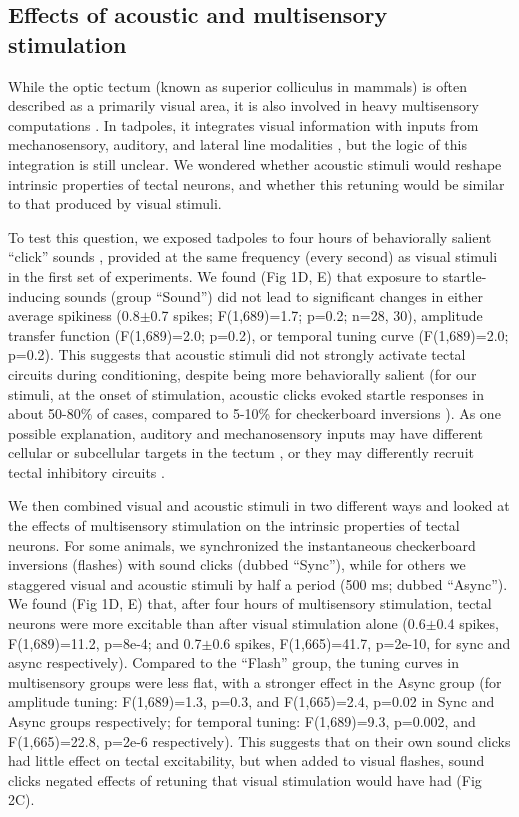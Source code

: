 \documentclass{article}
\begin{document}
\subsection*{Effects of acoustic and multisensory stimulation}

While the optic tectum (known as superior colliculus in mammals) is often described as a primarily visual area, it is also involved in heavy multisensory computations \citep{stein2014}. In tadpoles, it integrates visual information with inputs from mechanosensory, auditory, and lateral line modalities \citep{deeg2009,pratt2009,hiramoto2009,felch2016,truszkowski2017}, but the logic of this integration is still unclear. We wondered whether acoustic stimuli would reshape intrinsic properties of tectal neurons, and whether this retuning would be similar to that produced by visual stimuli. 

To test this question, we exposed tadpoles to four hours of behaviorally salient “click” sounds \citep{james2015,truszkowski2017}, provided at the same frequency (every second) as visual stimuli in the first set of experiments. We found (Fig 1D, E) that exposure to startle-inducing sounds (group “Sound”) did not lead to significant changes in either average spikiness (0.8$\pm$0.7 spikes; F(1,689)=1.7; p=0.2; n=28, 30), amplitude transfer function (F(1,689)=2.0; p=0.2), or temporal tuning curve (F(1,689)=2.0; p=0.2). This suggests that acoustic stimuli did not strongly activate tectal circuits during conditioning, despite being more behaviorally salient (for our stimuli, at the onset of stimulation, acoustic clicks evoked startle responses in about 50-80\% of cases, compared to 5-10\% for checkerboard inversions \citep{james2015,truszkowski2017}). As one possible explanation, auditory and mechanosensory inputs may have different cellular or subcellular targets in the tectum \citep{bollmann2009}, or they may differently recruit tectal inhibitory circuits \citep{liu2016,hamodi2016}.

We then combined visual and acoustic stimuli in two different ways and looked at the effects of multisensory stimulation on the intrinsic properties of tectal neurons. For some animals, we synchronized the instantaneous checkerboard inversions (flashes) with sound clicks (dubbed “Sync”), while for others we staggered visual and acoustic stimuli by half a period (500 ms; dubbed “Async”). We found (Fig 1D, E) that, after four hours of multisensory stimulation, tectal neurons were more excitable than after visual stimulation alone (0.6$\pm$0.4 spikes, F(1,689)=11.2, p=8e-4; and 0.7$\pm$0.6 spikes, F(1,665)=41.7, p=2e-10, for sync and async respectively). Compared to the “Flash” group, the tuning curves in multisensory groups were less flat, with a stronger effect in the Async group (for amplitude tuning: F(1,689)=1.3, p=0.3, and F(1,665)=2.4, p=0.02 in Sync and Async groups respectively; for temporal tuning: F(1,689)=9.3, p=0.002, and F(1,665)=22.8, p=2e-6 respectively). This suggests that on their own sound clicks had little effect on tectal excitability, but when added to visual flashes, sound clicks negated effects of retuning that visual stimulation would have had (Fig 2C).
\end{document}
